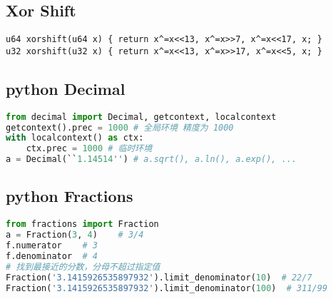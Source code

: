 \documentclass[a4paper,landscape,twocolumn]{ctexart}
\begin{document}
\subsection{Xor \space Shift}

\begin{lstlisting}
u64 xorshift(u64 x) { return x^=x<<13, x^=x>>7, x^=x<<17, x; }
u32 xorshift(u32 x) { return x^=x<<13, x^=x>>17, x^=x<<5, x; }
\end{lstlisting}

\subsection{python Decimal}

\begin{lstlisting}[language=python]
from decimal import Decimal, getcontext, localcontext
getcontext().prec = 1000 # 全局环境 精度为 1000
with localcontext() as ctx:
	ctx.prec = 1000 # 临时环境
a = Decimal(``1.14514'') # a.sqrt(), a.ln(), a.exp(), ...
\end{lstlisting}

\subsection{python Fractions}

\begin{lstlisting}[language=python]
from fractions import Fraction
a = Fraction(3, 4)    # 3/4
f.numerator    # 3
f.denominator  # 4
# 找到最接近的分数，分母不超过指定值
Fraction('3.1415926535897932').limit_denominator(10)  # 22/7
Fraction('3.1415926535897932').limit_denominator(100)  # 311/99
\end{lstlisting}
\end{document}
